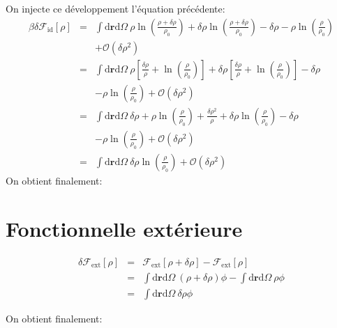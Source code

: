 On injecte ce développement l'équation précédente:
\begin{eqnarray}
\beta \delta \mathcal{F}_\mathrm{id}[\rho] &=& \int\mathrm{d}\boldsymbol{r}\mathrm{d}\Omega\ \rho \ln(\frac{\rho + \delta \rho}{\rho_0})  + \delta \rho\ln(\frac{\rho + \delta \rho}{\rho_0}) - \delta\rho - \rho\ln(\frac{\rho}{\rho_0})\\
& & + \mathcal{O}(\delta\rho^{2}) \nonumber \\
&=& \int\mathrm{d}\boldsymbol{r}\mathrm{d}\Omega\ \rho [\frac{\delta \rho}{\rho} + \ln(\frac{\rho}{\rho_0})] + \delta \rho[\frac{\delta \rho}{\rho} + \ln(\frac{\rho}{\rho_0})] - \delta\rho \\
& & - \rho\ln(\frac{\rho}{\rho_0}) + \mathcal{O}(\delta\rho^{2}) \nonumber \\
&=& \int\mathrm{d}\boldsymbol{r}\mathrm{d}\Omega\ \delta\rho + \rho \ln(\frac{\rho}{\rho_0}) + \frac{\delta \rho^2}{\rho} + \delta \rho \ln(\frac{\rho}{\rho_0}) - \delta\rho \\
& & - \rho\ln(\frac{\rho}{\rho_0}) + \mathcal{O}(\delta\rho^{2}) \nonumber \\
&=& \int\mathrm{d}\boldsymbol{r}\mathrm{d}\Omega\ \delta \rho \ln(\frac{\rho}{\rho_0}) + \mathcal{O}(\delta\rho^{2})
\end{eqnarray}
On obtient finalement:

\section{Fonctionnelle extérieure}
\label{sec:annexes:grad:ext}
\begin{eqnarray}
\delta \mathcal{F}_\mathrm{ext}[\rho] &=& \mathcal{F}_\mathrm{ext}[\rho + \delta \rho] -\mathcal{F}_\mathrm{ext}[\rho] \\
&=& \int\mathrm{d}\boldsymbol{r}\mathrm{d}\Omega\ (\rho+\delta\rho)\phi - \int\mathrm{d}\boldsymbol{r}\mathrm{d}\Omega\ \rho\phi  \\
&=& \int\mathrm{d}\boldsymbol{r}\mathrm{d}\Omega\ \delta\rho\phi
\end{eqnarray}

On obtient finalement:


